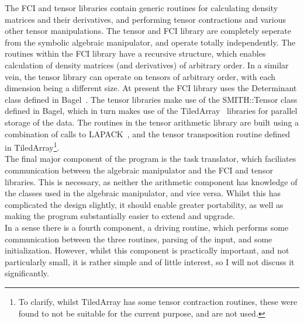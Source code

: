 \noindent The FCI and tensor libraries contain generic routines for calculating
density matrices and their derivatives, and performing tensor contractions and
various other tensor manipulations. The tensor and FCI library are completely
seperate from the symbolic algebraic manipulator, and operate totally independently. The
routines within the FCI library have a recursive structure, which 
enables calculation of density matrices (and
derivatives) of arbitrary order. In a similar vein, the tensor library can
operate on tensors of arbitrary order, with each dimension being a different
size. At present the FCI  library uses the Determinant class defined in
Bagel~\cite{BAGEL}. The tensor libraries make use of the SMITH::Tensor class
defined in Bagel, which in turn makes use of the TiledArray~\cite{TiledArray}
libraries for parallel storage of the data.  The routines in the tensor
arithmetic library are built using a combination of calls to
LAPACK~\cite{LAPACK}, and the tensor transposition routine defined in
TiledArray\footnote{ To clarify, whilst TiledArray has some tensor contraction
routines, these were found to not be suitable for the current purpose, and are
not used.}.\\

\noindent The final major component of the program is the task translator,
which faciliates communication between the algebraic manipulator and the 
FCI and tensor libraries. This is necessary, as
neither the arithmetic component has knowledge of the classes used in
the algebraic manipulator, and vice versa. Whilst this has complicated the
design slightly, it should enable greater portability, as well as making the
program substantially easier to extend and upgrade.\\ 

\noindent In a sense there is a fourth component, a driving routine, which
performs some communication between the three routines, parsing of the input,
and some initialization. However, whilst this component is practically
important, and not particularly small, it is rather simple and of little
interest, so I will not discuss it significantly.

